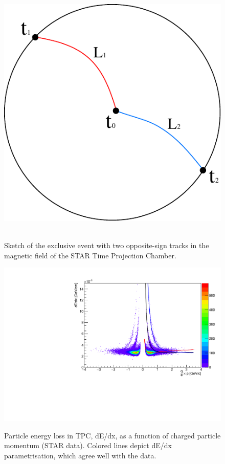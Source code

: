 \documentclass[a4paper,11pt]{article}
\begin{document}
\begin{figure}[ht]
\begin{minipage}[b]{0.44\linewidth}
\centering
\includegraphics[width=0.7\linewidth]{graphics/scheme.pdf}~\\[15pt]\label{fig:TofSketch}\caption{Sketch of the exclusive event with two opposite-sign tracks in the magnetic field of the STAR Time Projection Chamber.\vspace{12pt}}
\end{minipage}
\hspace{0.1cm}
\begin{minipage}[b]{0.55\linewidth}
\centering
\includegraphics[width=\linewidth]{graphics/TestOfDEdxParametrisation.pdf}\label{fig:dEdx}\caption{Particle energy loss in TPC, dE/dx, as a function of charged particle momentum (STAR data). Colored lines depict dE/dx parametrisation, which agree well with the data.}
\end{minipage}
\end{figure}
\end{document}
